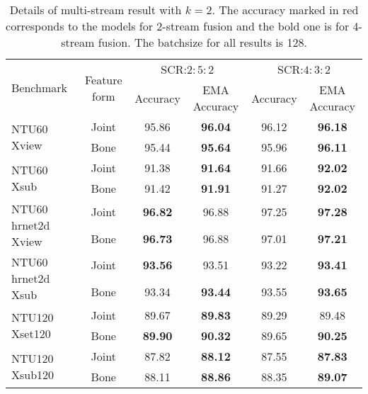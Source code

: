 \documentclass[10pt,twocolumn,letterpaper]{article}
\begin{document}
\begin{table*}[htbp]
  \centering
  \caption{Details of multi-stream result with $k=2$. The accuracy marked in red corresponds to the models for 2-stream fusion and the bold one is for 4-stream fusion. The batchsize for all results is 128.}
    \begin{tabular}{l|c|cc|cc}
    \toprule
    \multirow{2}[0]{*}{Benchmark} & \multirow{2}[0]{*}{Feature form} & \multicolumn{2}{c}{SCR:$2:5:2$}& \multicolumn{2}{c}{SCR:$4:3:2$}\\
              &               &    Accuracy & EMA Accuracy& Accuracy & EMA Accuracy\\
    \midrule
    \multirow{2}[2]{*}{NTU60 Xview} &  Joint  & 95.86  & \textbf{96.04} &  96.12 &  \textbf{\color{red}96.18}\\
                                    &  Bone   & 95.44  &\textbf{ 95.64} &  95.96  &   \textbf{\color{red}96.11}\\
    \midrule
    \multirow{2}[2]{*}{NTU60 Xsub} & Joint  & 91.38  & \textbf{91.64} & 91.66  & \textbf{\color{red}92.02}\\
                                   & Bone   & 91.42  & \textbf{91.91} & 91.27  & \textbf{\color{red}92.02}\\
    \midrule
    \multirow{2}[2]{*}{NTU60 hrnet2d Xview } &  Joint  & \textbf{96.82}  & 96.88 & 97.25  &   \textbf{\color{red}97.28}\\
                                             &   Bone   & \textbf{96.73}  & 96.88 & 97.01  &  \textbf{\color{red}97.21}\\
    \midrule
    \multirow{2}[2]{*}{NTU60 hrnet2d Xsub} & Joint   &  \textbf{\color{red}93.56}  &{93.51} &  93.22 &  \textbf{93.41}\\
                                           & Bone & 93.34  &  \textbf{93.44} &  93.55 & \textbf{\color{red}93.65}\\
    \midrule
    \multirow{2}[1]{*}{NTU120 Xset120} & Joint   & 89.67  & \textbf{\color{red}89.83}  &  89.29 & 89.48 \\
                                       & Bone   & \textbf{89.90} & \textbf{\color{red}90.32}  &  89.65 &  \textbf{90.25}\\
    \midrule
    \multirow{2}[2]{*}{NTU120 Xsub120} & Joint   & 87.82  & \textbf{\color{red}88.12} &  87.55 & \textbf{87.83}\\
                                       & Bone    & 88.11  &  \textbf{88.86} &  88.35 & \textbf{\color{red}89.07}\\

\end{tabular}
\end{table*}
\end{document}
